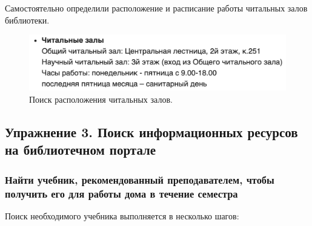 \documentclass[14pt,a4paper,report]{report}
\begin{document}
Самостоятельно определили расположение и расписание работы читальных залов библиотеки.

\begin{figure}[h!]
\centering
\includegraphics[scale = 0.5]{124.png}
\caption{Поиск расположения читальных залов.}
\label{image:1}
\end{figure}

\subsection{Упражнение 3. Поиск информационных ресурсов на библиотечном портале}

\subsubsection{Найти учебник, рекомендованный преподавателем, чтобы получить его для работы дома в течение семестра}

Поиск необходимого учебника выполняется в несколько шагов:
\end{document}
